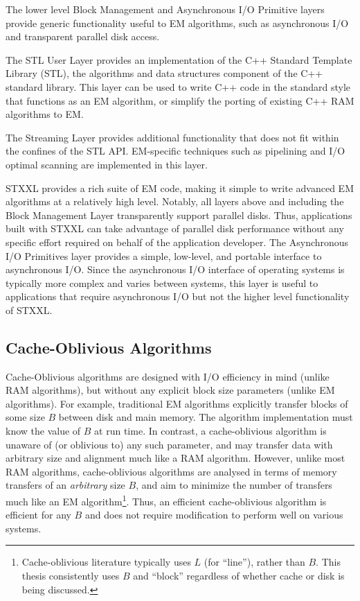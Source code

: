 \documentclass[12pt]{carletoncsthesis}
\begin{document}
The lower level Block Management and Asynchronous I/O Primitive layers provide
generic functionality useful to EM algorithms, such as asynchronous
I/O and transparent parallel disk access.

The STL User Layer provides an implementation of the C++ Standard Template
Library (STL), the algorithms and data structures component of the C++
standard library.  This layer can be used to write C++ code in the standard
style that functions as an EM algorithm, or simplify the porting of existing
C++ RAM algorithms to EM.

The Streaming Layer provides additional functionality that does not fit
within the confines of the STL API.  EM-specific techniques such as pipelining
and I/O optimal scanning are implemented in this layer.

STXXL provides a rich suite of EM code, making it simple to write advanced
EM algorithms at a relatively high level.  Notably, all layers above and
including the Block Management Layer transparently support parallel disks.
Thus, applications built with STXXL can take advantage of parallel disk
performance without any specific effort required on behalf of the
application developer.  The Asynchronous I/O Primitives layer provides a
simple, low-level, and portable interface to asynchronous I/O.  Since the
asynchronous I/O interface of operating systems is typically more complex
and varies between systems, this layer is useful to applications that require
asynchronous I/O but not the higher level functionality of STXXL.

\subsection{Cache-Oblivious Algorithms}


Cache-Oblivious algorithms \cite{cacheoblivious} are designed with I/O
efficiency in mind (unlike RAM algorithms), but without any explicit
block size parameters (unlike EM algorithms).  For example, traditional
EM algorithms explicitly transfer blocks of some size $B$ between disk
and main memory.  The algorithm implementation must know the value of $B$
at run time.  In contrast, a cache-oblivious algorithm is unaware of (or
oblivious to) any such parameter, and may transfer data with arbitrary size
and alignment much like a RAM algorithm.  However, unlike most RAM algorithms,
cache-oblivious algorithms are analysed in terms of memory transfers of an
{\em arbitrary} size $B$, and aim to minimize the number of transfers much
like an EM algorithm\footnote{Cache-oblivious literature typically uses
$L$ (for ``line''), rather than $B$.  This thesis consistently uses $B$ and
``block'' regardless of whether cache or disk is being discussed.}. Thus,
an efficient cache-oblivious algorithm is efficient for any $B$ and does
not require modification to perform well on various systems.
\end{document}
